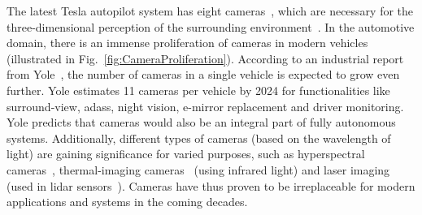 The latest Tesla autopilot system has eight cameras~\cite{tesla}, which are necessary for the three-dimensional perception of the surrounding environment~\cite{elluswamy2021predicting}.
In the automotive domain, there is an immense proliferation of cameras in modern vehicles (illustrated in Fig.~\ref{fig:CameraProliferation}).
According to an industrial report from Yole~\cite{yole19}, the number of cameras in a single vehicle is expected to grow even further. Yole estimates 11 cameras per vehicle by 2024 for functionalities like surround-view, \glspl{adas}, night vision, e-mirror replacement and driver monitoring.
Yole predicts that cameras would also be an integral part of fully autonomous systems.
Additionally, different types of cameras (based on the wavelength of light) are gaining significance for varied purposes, such as hyperspectral cameras~\cite{behmann2018specim}, thermal-imaging cameras~\cite{lee2018analyzing} (using infrared light) and laser imaging (used in lidar sensors~\cite{li2020lidar}). 
Cameras have thus proven to be irreplaceable for modern applications and systems in the coming decades.